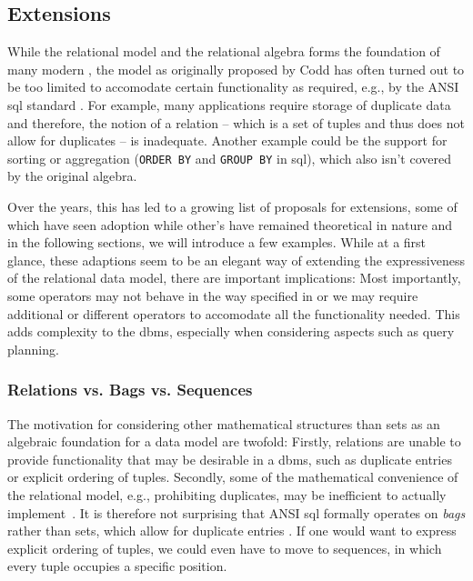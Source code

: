 \subsection{Extensions}
\label{section:rel_extensions}

While the relational model and the relational algebra forms the foundation of many modern , the model as originally proposed by Codd has often turned out to be too limited to accomodate certain functionality as required, e.g., by the ANSI \acrshort{sql} standard \cite{Libkin:2003Expressive,XOpen:1996SQL}. For example, many applications require storage of duplicate data and therefore, the notion of a relation -- which is a set of tuples and thus does not allow for duplicates -- is inadequate. Another example could be the support for sorting or aggregation (\texttt{ORDER BY} and \texttt{GROUP BY} in \acrshort{sql}), which also isn't covered by the original algebra.

Over the years, this has led to a growing list of proposals for extensions, some of which have seen adoption while other's have remained theoretical in nature and in the following sections, we will introduce a few examples. While at a first glance, these adaptions seem to be an elegant way of extending the expressiveness of the relational data model, there are important implications: Most importantly, some operators may not behave in the way specified in  or we may require additional or different operators to accomodate all the functionality needed. This adds complexity to the \acrshort{dbms}, especially when considering aspects such as query planning.

\subsubsection{Relations vs. Bags vs. Sequences}

The motivation for considering other mathematical structures than sets as an algebraic foundation for a data model are twofold: Firstly, relations are unable to provide functionality that may be desirable in a \acrshort{dbms}, such as duplicate entries or explicit ordering of tuples. Secondly, some of the mathematical convenience of the relational model, e.g., prohibiting duplicates, may be inefficient to actually implement~\cite{Garcia:2009Database}. It is therefore not surprising that ANSI \acrshort{sql}  \cite{XOpen:1996SQL} formally operates on \emph{bags} rather than sets, which allow for duplicate entries \cite{Garcia:2009Database,Chamberlin:2012Early}. If one would want to express explicit ordering of tuples, we could even have to move to sequences, in which every tuple occupies a specific position.

